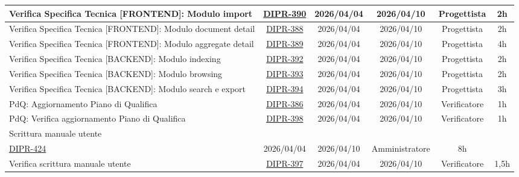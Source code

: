 \documentclass[a4paper,12pt]{article}
\begin{document}
\begin{spacing}{1}
\begin{longtable}{|p{4cm}|c|c|c|c|c|}
        \hline
        Verifica Specifica Tecnica [FRONTEND]: Modulo import & \href{https://7zpus.atlassian.net/browse/DIPR-390}{DIPR-390} & 2026/04/04 & 2026/04/10 & Progettista & 2h \\
        \hline
        Verifica Specifica Tecnica [FRONTEND]: Modulo document detail & \href{https://7zpus.atlassian.net/browse/DIPR-388}{DIPR-388} & 2026/04/04 & 2026/04/10 & Progettista & 2h \\
        \hline
        Verifica Specifica Tecnica [FRONTEND]: Modulo aggregate detail & \href{https://7zpus.atlassian.net/browse/DIPR-389}{DIPR-389} & 2026/04/04 & 2026/04/10 & Progettista & 4h \\
        \hline
        Verifica Specifica Tecnica [BACKEND]: Modulo indexing & \href{https://7zpus.atlassian.net/browse/DIPR-392}{DIPR-392} & 2026/04/04 & 2026/04/10 & Progettista & 2h \\
        \hline
        Verifica Specifica Tecnica [BACKEND]: Modulo browsing & \href{https://7zpus.atlassian.net/browse/DIPR-393}{DIPR-393} & 2026/04/04 & 2026/04/10 & Progettista & 2h \\
        \hline
        Verifica Specifica Tecnica [BACKEND]: Modulo search e export & \href{https://7zpus.atlassian.net/browse/DIPR-394}{DIPR-394} & 2026/04/04 & 2026/04/10 & Progettista & 3h \\
        \hline   
        PdQ: Aggiornamento Piano di Qualifica & \href{https://7zpus.atlassian.net/browse/DIPR-386}{DIPR-386} & 2026/04/04 & 2026/04/10 & Verificatore & 1h \\
        \hline
        PdQ: Verifica aggiornamento Piano di Qualifica & \href{https://7zpus.atlassian.net/browse/DIPR-398}{DIPR-398} & 2026/04/04 & 2026/04/10 & Verificatore & 1h \\
        \hline
        Scrittura manuale utente & \begin{tabular}[c]{@{}c@{}} \href{https://7zpus.atlassian.net/browse/DIPR-396}{DIPR-396}\\\href{https://7zpus.atlassian.net/browse/DIPR-424}{DIPR-424} \end{tabular} & 2026/04/04 & 2026/04/10 & Amministratore & 8h \\
        \hline
        Verifica scrittura manuale utente & \href{https://7zpus.atlassian.net/browse/DIPR-397}{DIPR-397} & 2026/04/04 & 2026/04/10 & Verificatore & 1,5h \\
        \hline
        

\end{longtable}
\end{spacing}
\end{document}
